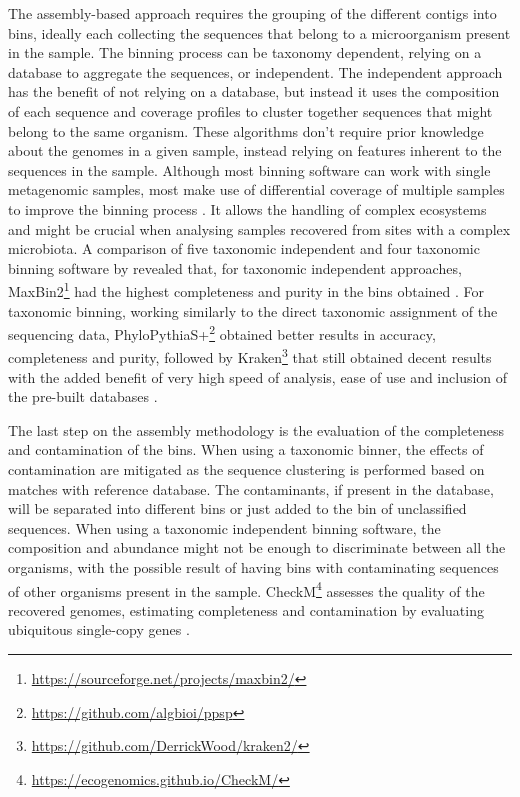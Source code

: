 The assembly-based approach requires the grouping of the different contigs into bins, ideally each collecting the sequences that belong to a microorganism present in the sample. The binning process can be taxonomy dependent, relying on a database to aggregate the sequences, or independent. The independent approach has the benefit of not relying on a database, but instead it uses the composition of each sequence and coverage profiles to cluster together sequences that might belong to the same organism. These algorithms don’t require prior knowledge about the genomes in a given sample, instead relying on features inherent to the sequences in the sample. Although most binning software can work with single metagenomic samples, most make use of differential coverage of multiple samples to improve the binning process \citep{sedlar_bioinformatics_2017}. It allows the handling of complex ecosystems and might be crucial when analysing samples recovered from sites with a complex microbiota. A comparison of five taxonomic independent  and four taxonomic binning software by \cite{sczyrba_critical_2017} revealed that, for taxonomic independent approaches, MaxBin2\footnote{\url{https://sourceforge.net/projects/maxbin2/}} had the highest completeness and purity in the bins obtained \citep{}. For taxonomic binning, working similarly to the direct taxonomic assignment of the sequencing data, PhyloPythiaS+\footnote{\url{https://github.com/algbioi/ppsp}} obtained better results in accuracy, completeness and purity, followed by Kraken\footnote{\url{https://github.com/DerrickWood/kraken2/}} that still obtained decent results with the added benefit of very high speed of analysis, ease of use and inclusion of the pre-built databases \citep{gregor_phylopythias_2016, wood_kraken_2014}.

The last step on the assembly methodology is the evaluation of the completeness and contamination of the bins. When using a taxonomic binner, the effects of contamination are mitigated as the sequence clustering is performed based on matches with reference database. The contaminants, if present in the database, will be separated into different bins or just added to the bin of unclassified sequences. When using a taxonomic independent binning software, the composition and abundance might not be enough to discriminate between all the organisms, with the possible result of having bins with contaminating sequences of other organisms present in the sample. CheckM\footnote{\url{https://ecogenomics.github.io/CheckM/}} assesses the quality of the recovered genomes, estimating completeness and contamination by evaluating ubiquitous single-copy genes \citep{parks_checkm_2015}.
 
